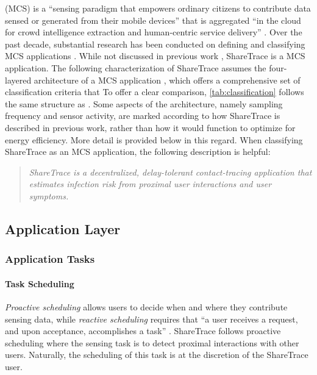  (MCS) is a ``sensing paradigm that empowers ordinary citizens to contribute data sensed or generated from their mobile devices'' that is aggregated ``in the cloud for crowd intelligence extraction and human-centric service delivery'' \citep{Guo2015}. Over the past decade, substantial research has been conducted on defining and classifying MCS applications \cite[and references therein]{Capponi2019, Guo2015}. While not discussed in previous work \cite{Ayday2020, Ayday2021}, ShareTrace is a MCS application. The following characterization of ShareTrace assumes the four-layered architecture of a MCS application \cite{Capponi2019}, which offers a comprehensive set of classification criteria that To offer a clear comparison, \cref{tab:classification} follows the same structure as \citet{Capponi2019}. Some aspects of the architecture, namely sampling frequency and sensor activity, are marked according to how ShareTrace is described in previous work, rather than how it would function to optimize for energy efficiency. More detail is provided below in this regard. When classifying ShareTrace as an MCS application, the following description is helpful:
\begin{quote}
  \emph{ShareTrace is a decentralized, delay-tolerant contact-tracing application that estimates infection risk from proximal user interactions and user symptoms.}
\end{quote}

\subsection{Application Layer}

\subsubsection{Application Tasks}

\paragraph{Task Scheduling}

\emph{Proactive scheduling} allows users to decide when and where they contribute sensing data, while \emph{reactive scheduling} requires that ``a user receives a request, and upon acceptance, accomplishes a task'' \cite{Capponi2019}. ShareTrace follows proactive scheduling where the sensing task is to detect proximal interactions with other users. Naturally, the scheduling of this task is at the discretion of the ShareTrace user.

